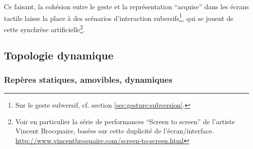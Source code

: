 \indent Ce faisant, la cohésion entre le geste et la représentation ``acquise'' dans les écrans tactile laisse la place à des scénarios d'interaction subersifs\footnote{Sur le geste subversif, cf. section \ref{sec:gesture:subversion}.}, qui se jouent de cette synchrèse artificielle\footnote{Voir en particulier la série de performances ``Screen to screen'' de l'artiste Vincent Brocquaire, basées sur cette duplicité de l'écran/interface. \url{http://www.vincentbroquaire.com/screen-to-screen.html}}.\\


\subsection{Topologie dynamique}

\subsubsection{Repères statiques, amovibles, dynamiques}

